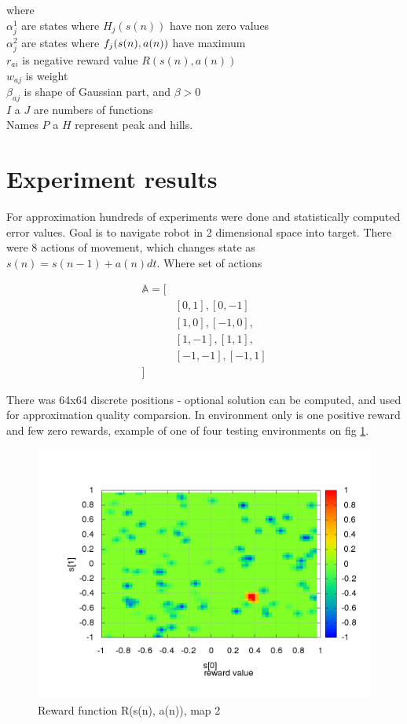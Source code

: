 \documentclass{acmbulletin}
\begin{document}
where \\
$\alpha^1_j$ are states where $H_j(s(n))$ have non zero values \\
$\alpha^2_j$ are states where $f_j(\boldmath{s(n), a(n)})$ have maximum \\
$r_{ai}$ is negative reward value $R(s(n), a(n))$ \\
$w_{aj}$ is weight \\
$\beta_{aj}$ is shape of Gaussian part, and $\beta > 0$ \\
$I$ a $J$ are numbers of functions \\

Names $P$ a $H$ represent peak and hills.

\section{Experiment results}

For approximation hundreds of experiments were done and statistically computed error values.
Goal is to navigate robot in 2 dimensional space into target. There were 8 actions of movement, which
changes state as $s(n) = s(n-1) + a(n)dt$.
Where set of actions


\begin{align}
\mathbb{A} = [& \nonumber \\
&[0, 1], [0, -1] \nonumber  \\
&[1,  0], [-1, 0], \nonumber \\
&[1, -1], [1, 1], \nonumber \\
&[-1, -1], [-1, 1] \nonumber  \\
					]& \nonumber
\end{align}


There was 64x64 discrete positions - optional
solution can be computed, and used for approximation quality comparsion.
In environment only is one positive reward and few zero rewards, example
of one of four testing environments on fig \ref{img:experiment_reward_function}.

\begin{figure}[!htb]
\centering
\includegraphics[scale=.3]{../../results_q_learning/map_2/reward_value_surface.png}
\caption{Reward function R(s(n), a(n)), map 2}
\label{img:experiment_reward_function}
\end{figure}
\end{document}
